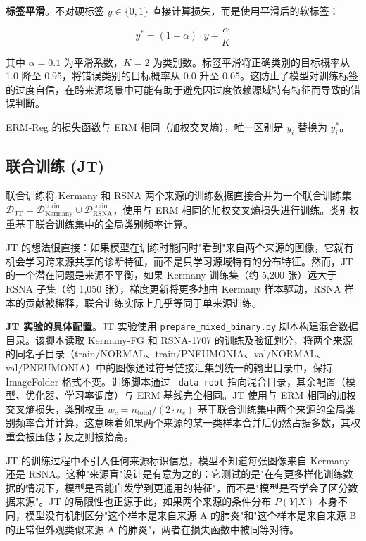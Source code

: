 \documentclass[12pt,a4paper,UTF8,openany]{ctexbook}
\begin{document}
\textbf{标签平滑}。不对硬标签 $y \in \{0, 1\}$ 直接计算损失，而是使用平滑后的软标签：

\begin{equation}
y^* = (1 - \alpha) \cdot y + \frac{\alpha}{K}
\end{equation}

其中 $\alpha=0.1$ 为平滑系数，$K=2$ 为类别数。标签平滑将正确类别的目标概率从 1.0 降至 0.95，将错误类别的目标概率从 0.0 升至 0.05。这防止了模型对训练标签的过度自信，在跨来源场景中可能有助于避免因过度依赖源域特有特征而导致的错误判断。

ERM-Reg 的损失函数与 ERM 相同（加权交叉熵），唯一区别是 $y_i$ 替换为 $y_i^*$。

\subsection{联合训练 (JT)}

联合训练将 Kermany 和 RSNA 两个来源的训练数据直接合并为一个联合训练集 $\mathcal{D}_{\text{JT}} = \mathcal{D}_{\text{Kermany}}^{\text{train}} \cup \mathcal{D}_{\text{RSNA}}^{\text{train}}$，使用与 ERM 相同的加权交叉熵损失进行训练。类别权重基于联合训练集中的全局类别频率计算。

JT 的想法很直接：如果模型在训练时能同时"看到"来自两个来源的图像，它就有机会学习跨来源共享的诊断特征，而不是只学习源域特有的分布特征。然而，JT 的一个潜在问题是来源不平衡，如果 Kermany 训练集（约 5,200 张）远大于 RSNA 子集（约 1,050 张），梯度更新将更多地由 Kermany 样本驱动，RSNA 样本的贡献被稀释，联合训练实际上几乎等同于单来源训练。

\textbf{JT 实验的具体配置}。JT 实验使用 \texttt{prepare\_mixed\_binary.py} 脚本构建混合数据目录。该脚本读取 Kermany-FG 和 RSNA-1707 的训练及验证划分，将两个来源的同名子目录（train/NORMAL、train/PNEUMONIA、val/NORMAL、val/PNEUMONIA）中的图像通过符号链接汇集到统一的输出目录中，保持 ImageFolder 格式不变。训练脚本通过 \texttt{--data-root} 指向混合目录，其余配置（模型、优化器、学习率调度）与 ERM 基线完全相同。JT 使用与 ERM 相同的加权交叉熵损失，类别权重 $w_c = n_{\text{total}} / (2 \cdot n_c)$ 基于联合训练集中两个来源的全局类别频率合并计算，这意味着如果两个来源的某一类样本合并后仍然占据多数，其权重会被压低；反之则被抬高。

JT 的训练过程中不引入任何来源标识信息，模型不知道每张图像来自 Kermany 还是 RSNA。这种"来源盲"设计是有意为之的：它测试的是"在有更多样化训练数据的情况下，模型是否能自发学到更通用的特征"，而不是"模型是否学会了区分数据来源"。JT 的局限性也正源于此，如果两个来源的条件分布 $P(Y|X)$ 本身不同，模型没有机制区分"这个样本是来自来源 A 的肺炎"和"这个样本是来自来源 B 的正常但外观类似来源 A 的肺炎"，两者在损失函数中被同等对待。
\end{document}
